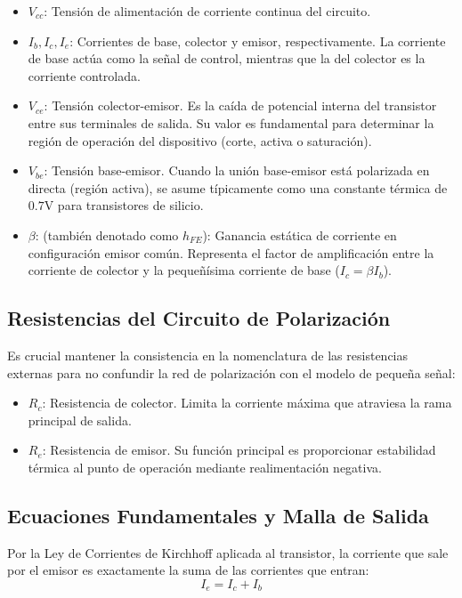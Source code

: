 \begin{itemize}
  \item $V_{cc}$: Tensión de alimentación de corriente continua del circuito.
  \item $I_b, I_c, I_e$: Corrientes de base, colector y emisor, respectivamente. La corriente de base actúa como la señal de control, mientras que la del colector es la corriente controlada.
  \item $V_{ce}$: Tensión colector-emisor. Es la caída de potencial interna del transistor entre sus terminales de salida. Su valor es fundamental para determinar la región de operación del dispositivo (corte, activa o saturación).
  \item $V_{be}$: Tensión base-emisor. Cuando la unión base-emisor está polarizada en directa (región activa), se asume típicamente como una constante térmica de $0.7\text{V}$ para transistores de silicio.
  \item $\beta$: (también denotado como $h_{FE}$): Ganancia estática de corriente en configuración emisor común. Representa el factor de amplificación entre la corriente de colector y la pequeñísima corriente de base ($I_c = \beta I_b$).
\end{itemize}

\subsection{Resistencias del Circuito de Polarización}
Es crucial mantener la consistencia en la nomenclatura de las resistencias externas para no confundir la red de polarización con el modelo de pequeña señal:
\begin{itemize}
  \item $R_c$: Resistencia de colector. Limita la corriente máxima que atraviesa la rama principal de salida. 
  \item $R_e$: Resistencia de emisor. Su función principal es proporcionar estabilidad térmica al punto de operación mediante realimentación negativa.
\end{itemize}

\subsection{Ecuaciones Fundamentales y Malla de Salida}

Por la Ley de Corrientes de Kirchhoff aplicada al transistor, la corriente que sale por el emisor es exactamente la suma de las corrientes que entran:
\begin{equation}
  I_e = I_c + I_b
\end{equation}

